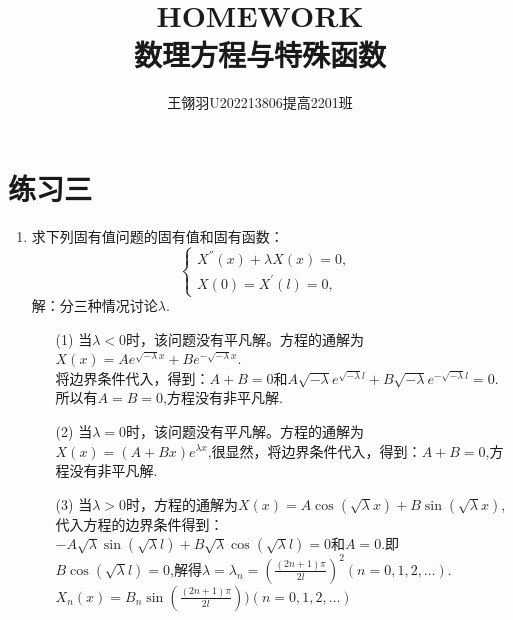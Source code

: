 \documentclass[11pt]{article}
\begin{document}
\title{\vspace{-2cm}HOMEWORK\\ 数理方程与特殊函数}
\author{王翎羽\quad U202213806\quad 提高2201班}
\maketitle

\section*{练习三}
\begin{enumerate}
    \item 求下列固有值问题的固有值和固有函数：
    \begin{equation*}
            \left\{
             \begin{array}{lr}
             X^{''}(x)+\lambda X(x)=0, &  \\
             X(0)=X^{'}(l)=0, &
             \end{array}
            \right.
            \end{equation*}
    解：分三种情况讨论$\lambda$.
    \begin{enumerate}
        \item[(1)] 当$\lambda <0$时，该问题没有平凡解。方程的通解为$X(x)=Ae^{\sqrt {-\lambda }x}+Be^{-\sqrt {-\lambda }x}$.\\将边界条件代入，得到：$A+B=0$和$A\sqrt {-\lambda }e^{\sqrt {-\lambda }l}+B\sqrt {-\lambda }e^{-\sqrt {-\lambda }l}=0$.\\所以有$A=B=0$,方程没有非平凡解.
        \item[(2)] 当$\lambda =0$时，该问题没有平凡解。方程的通解为$X(x)=(A+Bx)e^{\lambda x}$,很显然，将边界条件代入，得到：$A+B=0$,方程没有非平凡解.
        \item[(3)] 当$\lambda >0$时，方程的通解为$X(x)=A\cos(\sqrt {\lambda }x)+B\sin(\sqrt {\lambda }x)$,代入方程的边界条件得到：\\ $-A\sqrt {\lambda }\sin(\sqrt {\lambda }l)+B\sqrt {\lambda }\cos(\sqrt {\lambda }l)=0$和$A=0$.即$B\cos(\sqrt {\lambda }l)=0$,解得$\lambda =\lambda_n=(\frac{(2n+1)\pi}{2l})^2(n=0,1,2,\dots)$.$X_n(x)=B_{n}\sin(\frac{(2n+1)\pi}{2l}))(n=0,1,2,\dots)$

    \end{enumerate}


\end{enumerate}
\end{document}
